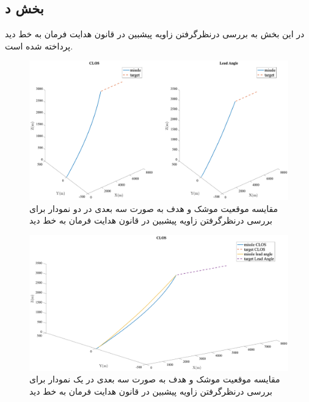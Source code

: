 \subsection{بخش د}
در این بخش به بررسی درنظرگرفتن زاویه پیشبین در قانون هدایت فرمان به خط دید پرداخته شده است.
\begin{figure}[H]
	\centering
	\includegraphics[width=\linewidth]{../Figure/j/3DoF_missle_vs_target_state_CLOS}
	\caption{مقایسه موقعیت موشک و هدف به صورت سه بعدی در دو نمودار  برای بررسی درنظرگرفتن زاویه پیشبین در قانون هدایت فرمان به خط دید}
\end{figure}


\begin{figure}[H]
	\centering
	\includegraphics[width=\linewidth]{../Figure/j/3DoF_missle_vs_target_state_CLOS_all_in}
	\caption{مقایسه موقعیت موشک و هدف به صورت سه بعدی در یک نمودار برای بررسی درنظرگرفتن زاویه پیشبین در قانون هدایت فرمان به خط دید}
\end{figure}


